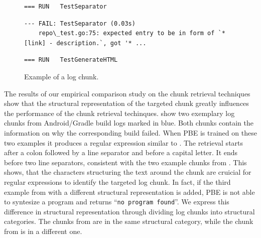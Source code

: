 \begin{figure}[!t]
  \centering
  \begin{lstlisting}[breaklines=true,frame=tlr]
=== RUN   TestSeparator
  \end{lstlisting}
  \vspace{-\baselineskip}
  \begin{lstlisting}[backgroundcolor=\color{Cerulean!60},breaklines=true,frame=rl]
--- FAIL: TestSeparator (0.03s)
    repo\_test.go:75: expected entry to be in form of `* [link] - description.`, got '* ...
  \end{lstlisting}
  \vspace{-\baselineskip}
  \begin{lstlisting}[breaklines=true,frame=blr]
=== RUN   TestGenerateHTML
  \end{lstlisting}  
  \caption{Example of a log chunk. 
  }
  \label{lst:chunk-example-3}
\end{figure}

The results of our empirical comparison study on the chunk retrieval techniques
show that the structural representation of the targeted chunk greatly influences
the performance of the chunk retrieval techinques.
 show two exemplary log chunks
from Android/Gradle build logs marked in blue.
Both chunks contain the information on why the
corresponding build failed. When PBE is trained on these two examples it produces
a regular expression similar to . The retrieval
starts after a colon followed by a line separator and before a capital letter.
It ends before two line separators, consistent with the two example chunks from
.
This shows, that the characters structuring the text around the chunk are
cruicial for regular expressions to identify the targeted log chunk.
In fact, if the third
example from  with a different structural
representation is added, PBE is not able to syntesize a program and returns
``\texttt{no program found}''.
We express this difference in structural representation through dividing log
chunks into structural categories. The chunks from
 are in the same structural
category, while the chunk from  is in a different one.


